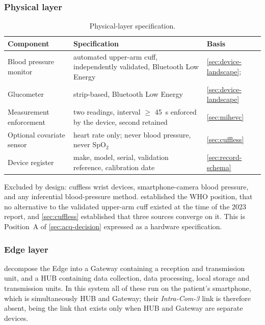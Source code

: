 \documentclass[12pt,a4paper,oneside]{report}
\begin{document}
\subsubsection{Physical layer}

\begin{table}[htbp]
\centering\small
\caption{Physical-layer specification.}\label{tab:physical-layer}
\begin{tabularx}{\textwidth}{@{}>{\raggedright\arraybackslash}p{3.6cm} X >{\raggedright\arraybackslash}p{2.9cm}@{}}
\toprule
\textbf{Component} & \textbf{Specification} & \textbf{Basis} \\
\midrule
Blood pressure monitor & automated upper-arm cuff, independently validated, Bluetooth Low Energy & \cref{sec:device-landscape}; \textcite{who2023hypertension} \\
Glucometer & strip-based, Bluetooth Low Energy & \cref{sec:device-landscape} \\
Measurement enforcement & two readings, interval $\geq$ 45~s enforced by the device, second retained & \cref{sec:mihevc} \\
Optional covariate sensor & heart rate only; never blood pressure, never SpO$_2$ & \cref{sec:cuffless} \\
Device register & make, model, serial, validation reference, calibration date & \cref{sec:record-schema} \\
\bottomrule
\end{tabularx}
\end{table}

Excluded by design: cuffless wrist devices, smartphone-camera blood pressure, and any inferential blood-pressure method.  established the WHO position, that no alternative to the validated upper-arm cuff existed at the time of the 2023 report, and \cref{sec:cuffless} established that three sources converge on it. This is Position~A of \cref{sec:acq-decision} expressed as a hardware specification.

\subsubsection{Edge layer}\label{sec:edge-layer}

\Textcite{mucchi2021} decompose the Edge into a Gateway containing a reception and transmission unit, and a HUB containing data collection, data processing, local storage and transmission units. In this system all of these run on the patient's smartphone, which is simultaneously HUB and Gateway; their \emph{Intra-Com-3} link is therefore absent, being the link that exists only when HUB and Gateway are separate devices.
\end{document}

